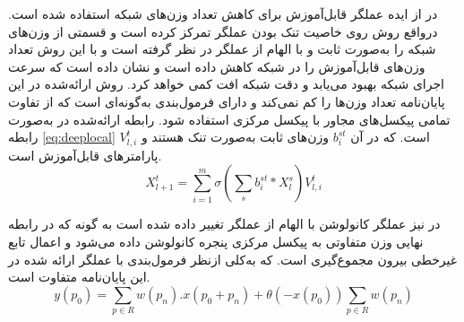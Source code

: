 در
\cite{juefei2017local} 
از ایده عملگر  قابل‌آموزش برای کاهش تعداد وزن‌های شبکه استفاده شده است. در‌واقع روش
\cite{juefei2017local} 
روی خاصیت تنک بودن
 عملگر  تمرکز کرده است و قسمتی از وزن‌های شبکه را به‌صورت ثابت و با الهام از عملگر  در نظر گرفته است و با این روش تعداد وزن‌های قابل‌آموزش را در شبکه کاهش داده است و نشان داده است که سرعت اجرای شبکه بهبود می‌یابد و دقت شبکه افت کمی خواهد کرد. روش ارائه‌شده در این پایان‌نامه تعداد وزن‌ها را کم نمی‌کند و دارای فرمول‌بندی به‌گونه‌ای است که از تفاوت تمامی پیکسل‌های مجاور با پیکسل مرکزی استفاده شود.
رابطه ارائه‌شده در 
\cite{juefei2017local} 
 به‌صورت رابطه
\ref{eq:deeplocal}
  است. که در آن 
  $b_i^{st}$
  وزن‌های ثابت به‌صورت تنک هستند و 
  $V_{l,i}^t$
  پارامترهای قابل‌آموزش است.
\begin{equation}\label{eq:deeplocal}
	X_{l+1}^t=\sum_{i=1}^{m}{\sigma(\sum_{s}{b_i^{st}*X_l^s })V_{l,i}^t}
\end{equation}

در 
\cite{yu2020searching}
نیز عملگر کانولوشن با الهام از عملگر  تغییر داده شده است به گونه که در رابطه نهایی وزن متفاوتی به پیکسل مرکزی پنجره کانولوشن داده می‌شود و اعمال تابع غیرخطی بیرون مجموع‌گیری است. که به‌کلی از‌نظر فرمول‌بندی با عملگر ارائه شده در این پایان‌نامه متفاوت است. 
\begin{equation}\label{eq:central-dif4}
	y(p_0) = \sum_{p \in R} {w(p_n).x(p_0+p_n)} +
	\theta(-x(p_0))\sum_{p \in R}{w(p_n)}
\end{equation}




 

  




